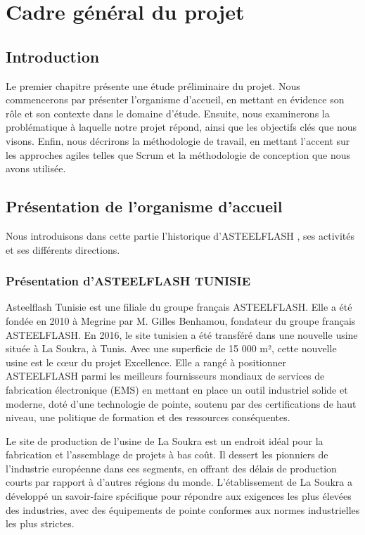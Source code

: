 ﻿\chapter{Cadre général du projet}




\section*{Introduction}

Le premier chapitre présente une étude préliminaire du projet. Nous commencerons par présenter l'organisme d'accueil, en mettant en évidence son rôle et son contexte dans le domaine d'étude. Ensuite, nous examinerons la problématique à laquelle notre projet répond, ainsi que les objectifs clés que nous visons. Enfin, nous décrirons la méthodologie de travail, en mettant l'accent sur les approches agiles telles que Scrum et la méthodologie de conception que nous avons utilisée.

\section{Présentation de l’organisme d’accueil } 
Nous introduisons dans cette partie l’historique d’ASTEELFLASH , ses activités et ses différents directions.
\subsection{Présentation d'ASTEELFLASH TUNISIE  }
Asteelflash Tunisie est une filiale du groupe français ASTEELFLASH. Elle a été fondée en 2010 à Megrine par M. Gilles Benhamou, fondateur du groupe français ASTEELFLASH. En 2016, le site tunisien a été transféré dans une nouvelle usine située à La Soukra, à Tunis. Avec une superficie de 15 000 m², cette nouvelle usine est le cœur du projet Excellence. Elle a rangé à positionner ASTEELFLASH parmi les meilleurs fournisseurs mondiaux de services de fabrication électronique (EMS) en mettant en place un outil industriel solide et moderne, doté d'une technologie de pointe, soutenu par des certifications de haut niveau, une politique de formation et des ressources conséquentes.

Le site de production de l'usine de La Soukra est un endroit idéal pour la fabrication et l'assemblage de projets à bas coût. Il dessert les pionniers de l'industrie européenne dans ces segments, en offrant des délais de production courts par rapport à d'autres régions du monde. L'établissement de La Soukra a développé un savoir-faire spécifique pour répondre aux exigences les plus élevées des industries, avec des équipements de pointe conformes aux normes industrielles les plus strictes.

